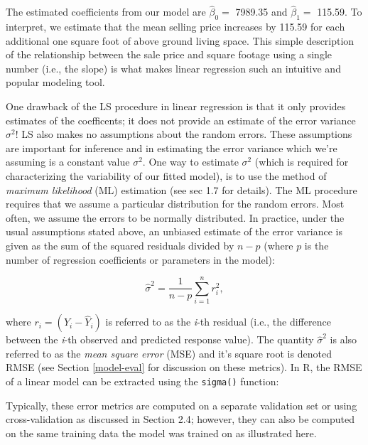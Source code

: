 \documentclass[]{krantz}
\makeatletter
\newenvironment{kframe}{%
\medskip{}
\setlength{\fboxsep}{.8em}
 \def\at@end@of@kframe{}%
 \ifinner\ifhmode%
  \def\at@end@of@kframe{\end{minipage}}%
  \begin{minipage}{\columnwidth}%
 \fi\fi%
 \def\FrameCommand##1{\hskip\@totalleftmargin \hskip-\fboxsep
 \colorbox{shadecolor}{##1}\hskip-\fboxsep
     \hskip-\linewidth \hskip-\@totalleftmargin \hskip\columnwidth}%
 \MakeFramed {\advance\hsize-\width
   \@totalleftmargin\z@ \linewidth\hsize
   \@setminipage}}%
 {\par\unskip\endMakeFramed%
 \at@end@of@kframe}
\newenvironment{block}[1]
  {
  \begin{itemize}
  \renewcommand{\labelitemi}{
    \raisebox{-.7\height}[0pt][0pt]{
      {\setkeys{Gin}{width=3em,keepaspectratio}\texttt{[image: icons/\#1]}}
    }
  }
  \setlength{\fboxsep}{1em}
  \begin{kframe}
  \item
  }
  {
  \end{kframe}
  \end{itemize}
  }
\newenvironment{note}
  {\begin{block}{note}}
  {\end{block}}
\makeatother
\begin{document}
The estimated coefficients from our model are \(\widehat{\beta}_0 =\) 7989.35 and \(\widehat{\beta}_1 =\) 115.59. To interpret, we estimate that the mean selling price increases by 115.59 for each additional one square foot of above ground living space. This simple description of the relationship between the sale price and square footage using a single number (i.e., the slope) is what makes linear regression such an intuitive and popular modeling tool.

One drawback of the LS procedure in linear regression is that it only provides estimates of the coefficents; it does not provide an estimate of the error variance \(\sigma^2\)! LS also makes no assumptions about the random errors. These assumptions are important for inference and in estimating the error variance which we're assuming is a constant value \(\sigma^2\). One way to estimate \(\sigma^2\) (which is required for characterizing the variability of our fitted model), is to use the method of \emph{maximum likelihood} (ML) estimation (see \citet{kutner-2005-applied} sec 1.7 for details). The ML procedure requires that we assume a particular distribution for the random errors. Most often, we assume the errors to be normally distributed. In practice, under the usual assumptions stated above, an unbiased estimate of the error variance is given as the sum of the squared residuals divided by \(n - p\) (where \(p\) is the number of regression coefficients or parameters in the model):

\begin{equation}
  \widehat{\sigma}^2 = \frac{1}{n - p}\sum_{i = 1} ^ n r_i ^ 2,
\end{equation}

where \(r_i = \left(Y_i - \widehat{Y}_i\right)\) is referred to as the \emph{i}-th residual (i.e., the difference between the \emph{i}-th observed and predicted response value). The quantity \(\widehat{\sigma}^2\) is also referred to as the \emph{mean square error} (MSE) and it's square root is denoted RMSE (see Section \ref{model-eval} for discussion on these metrics). In R, the RMSE of a linear model can be extracted using the \texttt{sigma()} function:

\begin{note}
Typically, these error metrics are computed on a separate validation set
or using cross-validation as discussed in Section 2.4; however, they can
also be computed on the same training data the model was trained on as
illustrated here.
\end{note}
\end{document}
